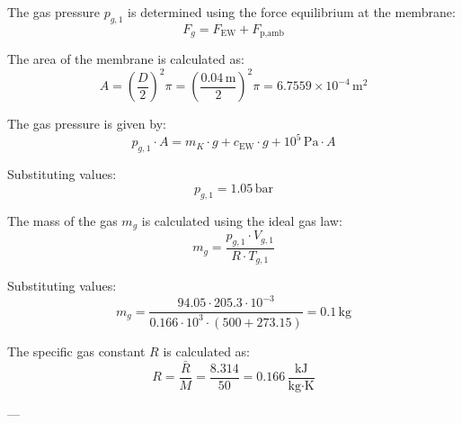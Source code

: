 The gas pressure \( p_{g,1} \) is determined using the force equilibrium at the membrane:  
\[
F_g = F_{\text{EW}} + F_{\text{p,amb}}
\]  

The area of the membrane is calculated as:  
\[
A = \left(\frac{D}{2}\right)^2 \pi = \left(\frac{0.04 \, \text{m}}{2}\right)^2 \pi = 6.7559 \times 10^{-4} \, \text{m}^2
\]  

The gas pressure is given by:  
\[
p_{g,1} \cdot A = m_K \cdot g + c_{\text{EW}} \cdot g + 10^5 \, \text{Pa} \cdot A
\]  

Substituting values:  
\[
p_{g,1} = 1.05 \, \text{bar}
\]  

The mass of the gas \( m_g \) is calculated using the ideal gas law:  
\[
m_g = \frac{p_{g,1} \cdot V_{g,1}}{R \cdot T_{g,1}}
\]  

Substituting values:  
\[
m_g = \frac{94.05 \cdot 205.3 \cdot 10^{-3}}{0.166 \cdot 10^3 \cdot (500 + 273.15)} = 0.1 \, \text{kg}
\]  

The specific gas constant \( R \) is calculated as:  
\[
R = \frac{\bar{R}}{M} = \frac{8.314}{50} = 0.166 \, \frac{\text{kJ}}{\text{kg·K}}
\]  

---